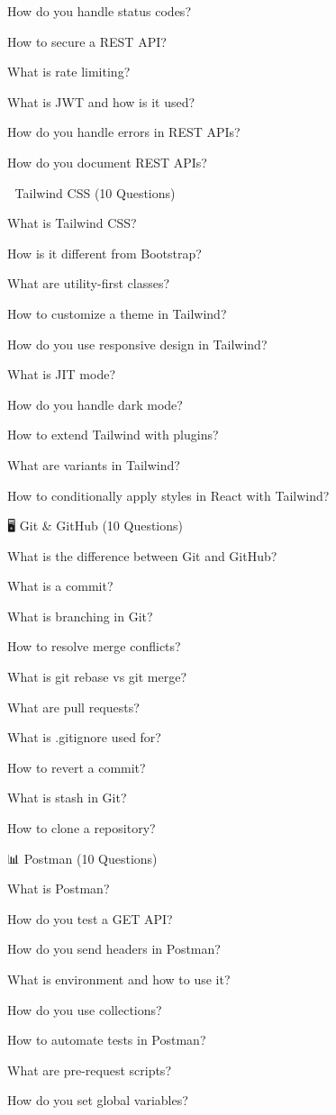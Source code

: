How do you handle status codes?

How to secure a REST API?

What is rate limiting?

What is JWT and how is it used?

How do you handle errors in REST APIs?

How do you document REST APIs?

🌟 Tailwind CSS (10 Questions)

What is Tailwind CSS?

How is it different from Bootstrap?

What are utility-first classes?

How to customize a theme in Tailwind?

How do you use responsive design in Tailwind?

What is JIT mode?

How do you handle dark mode?

How to extend Tailwind with plugins?

What are variants in Tailwind?

How to conditionally apply styles in React with Tailwind?

🖥️ Git & GitHub (10 Questions)

What is the difference between Git and GitHub?

What is a commit?

What is branching in Git?

How to resolve merge conflicts?

What is git rebase vs git merge?

What are pull requests?

What is .gitignore used for?

How to revert a commit?

What is stash in Git?

How to clone a repository?

📊 Postman (10 Questions)

What is Postman?

How do you test a GET API?

How do you send headers in Postman?

What is environment and how to use it?

How do you use collections?

How to automate tests in Postman?

What are pre-request scripts?

How do you set global variables?

